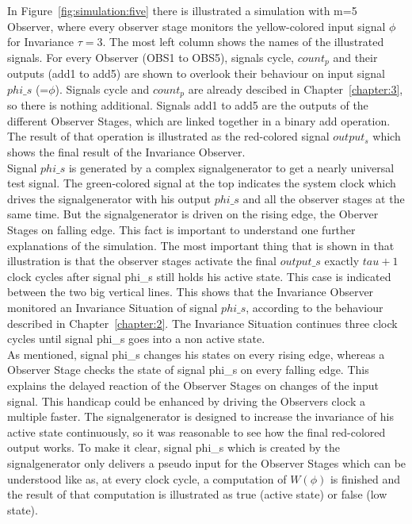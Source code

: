 In Figure~\ref{fig:simulation:five} there is illustrated a simulation with m=5 Observer, where every observer stage monitors the yellow-colored input signal $\phi$ for Invariance $\tau=3$. 
The most left column shows the names of the illustrated signals. For every Observer (OBS1 to OBS5), signals cycle, $count_p$ and their outputs (add1 to add5) are shown to overlook their 
behaviour on input signal $phi\_s$ (=$\phi$). Signals cycle and $count_p$ are already descibed in Chapter~\ref{chapter:3}, so there is nothing additional. 
Signals add1 to add5 are the outputs of the different Observer Stages, which are linked together in a binary add operation. 
The result of that operation is illustrated as the red-colored signal $output_s$ which shows the final result of the Invariance Observer. \\
Signal $phi\_s$ is generated by a complex signalgenerator to get a nearly universal test signal. The green-colored signal at the top indicates the system clock which drives the signalgenerator 
with his output $phi\_s$ and all the observer stages at the same time. But the signalgenerator is driven on the rising edge, the Oberver Stages on falling edge. 
This fact is important to understand one further explanations of the simulation. 
The most important thing that is shown in that illustration is that the observer stages activate the final $output\_s$ exactly $tau + 1$  clock cycles after signal phi\_s still holds his active state. 
This case is  indicated between the two big vertical lines. 
This shows that the Invariance Observer monitored an Invariance Situation of signal $phi\_s$, according to the behaviour described in Chapter~\ref{chapter:2}. 
The Invariance Situation continues three clock cycles until signal phi\_s goes into a non active state. \\
As mentioned, signal phi\_s changes his states on every rising edge, whereas a Observer Stage checks the state of signal phi\_s on every falling edge. 
This explains the delayed reaction of the Observer Stages on changes of the input signal. This handicap could be enhanced by driving the Observers clock a multiple faster. 
The signalgenerator is designed to increase the invariance of his active state continuously, so it was reasonable to see how the final red-colored output works. 
To make it clear, signal phi\_s which is created by the signalgenerator only delivers a pseudo input for the Observer Stages which can be understood like as, at every clock cycle, a computation of 
$W(\phi)$ is finished and the result of that computation is illustrated as true (active state) or false (low state). 
